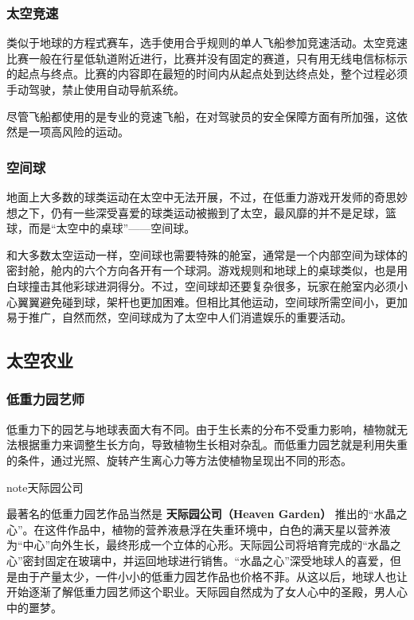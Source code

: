 \documentclass[letterpaper,10pt]{sphinxmanual}
\begin{document}
\subsubsection{太空竞速}
\label{profession:id16}
类似于地球的方程式赛车，选手使用合乎规则的单人飞船参加竞速活动。太空竞速比赛一般在行星低轨道附近进行，比赛并没有固定的赛道，只有用无线电信标标示的起点与终点。比赛的内容即在最短的时间内从起点处到达终点处，整个过程必须手动驾驶，禁止使用自动导航系统。

尽管飞船都使用的是专业的竞速飞船，在对驾驶员的安全保障方面有所加强，这依然是一项高风险的运动。


\subsubsection{空间球}
\label{profession:id17}
地面上大多数的球类运动在太空中无法开展，不过，在低重力游戏开发师的奇思妙想之下，仍有一些深受喜爱的球类运动被搬到了太空，最风靡的并不是足球，篮球，而是“太空中的桌球”——空间球。

和大多数太空运动一样，空间球也需要特殊的舱室，通常是一个内部空间为球体的密封舱，舱内的六个方向各开有一个球洞。游戏规则和地球上的桌球类似，也是用白球撞击其他彩球进洞得分。不过，空间球却还要复杂很多，玩家在舱室内必须小心翼翼避免碰到球，架杆也更加困难。但相比其他运动，空间球所需空间小，更加易于推广，自然而然，空间球成为了太空中人们消遣娱乐的重要活动。


\subsection{太空农业}
\label{profession:id18}

\subsubsection{低重力园艺师}
\label{profession:id19}
低重力下的园艺与地球表面大有不同。由于生长素的分布不受重力影响，植物就无法根据重力来调整生长方向，导致植物生长相对杂乱。而低重力园艺就是利用失重的条件，通过光照、旋转产生离心力等方法使植物呈现出不同的形态。

\begin{notice}{note}{天际园公司}

最著名的低重力园艺作品当然是 \textbf{天际园公司（Heaven Garden）} 推出的“水晶之心”。在这件作品中，植物的营养液悬浮在失重环境中，白色的满天星以营养液为“中心”向外生长，最终形成一个立体的心形。天际园公司将培育完成的“水晶之心”密封固定在玻璃中，并运回地球进行销售。“水晶之心”深受地球人的喜爱，但是由于产量太少，一件小小的低重力园艺作品也价格不菲。从这以后，地球人也让开始逐渐了解低重力园艺师这个职业。天际园自然成为了女人心中的圣殿，男人心中的噩梦。
\end{notice}
\end{document}
